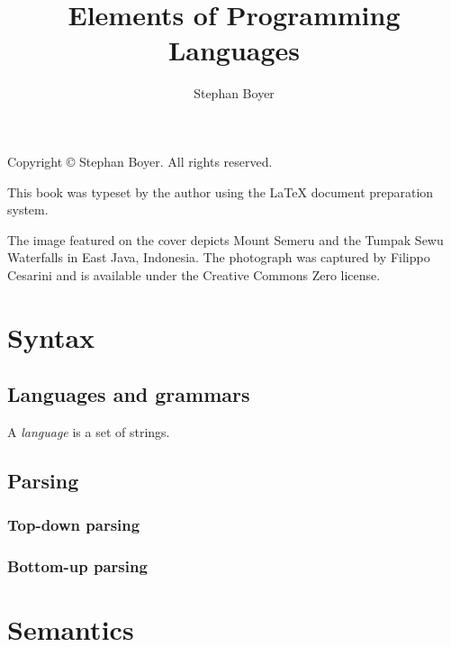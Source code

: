 \documentclass[oneside,14pt]{extbook}
\title{Elements of Programming Languages}
\author{Stephan Boyer}
\date{}
\begin{document}
  

  \frontmatter

  

  \pagebreak
  \hspace{0pt}
  \vfill
    \noindent Copyright \copyright{} \the\year{} Stephan Boyer. All rights reserved.

    \bigbreak

    \noindent This book was typeset by the author using the \LaTeX{} document preparation system.

    \bigbreak

    \noindent The image featured on the cover depicts Mount Semeru and the Tumpak Sewu Waterfalls in East Java, Indonesia. The photograph was captured by Filippo Cesarini and is available under the Creative Commons Zero license.
  \vfill
  \hspace{0pt}
  \pagebreak

  

  \tableofcontents

  \mainmatter

  \ChNameVar{}
  \ChNumVar{\fontsize{60}{62}\selectfont}
  \ChTitleVar{\Huge\bfseries\rm}
  \ChRuleWidth{1pt}

  \part{Syntax}

    \chapter{Languages and grammars}

      A \emph{language} is a set of strings.

    \chapter{Parsing}

      \section{Top-down parsing}

      \section{Bottom-up parsing}

  \part{Semantics}
\end{document}
